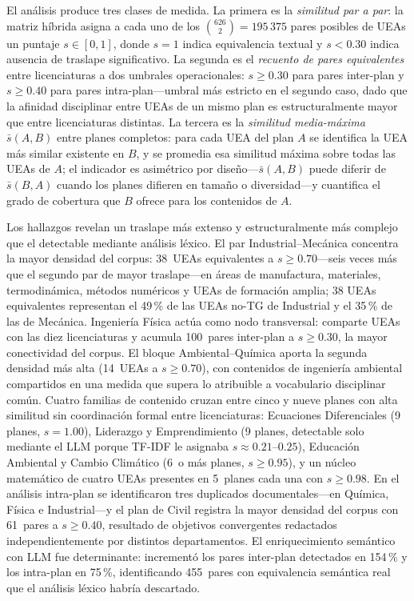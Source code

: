\documentclass[11pt,a4paper]{article}
\begin{document}
El análisis produce tres clases de medida.
La primera es la \textit{similitud par a par}: la matriz híbrida asigna a cada uno de los $\binom{626}{2} = 195\,375$ pares posibles de UEAs un puntaje $s \in [0,1]$, donde $s = 1$ indica equivalencia textual y $s < 0.30$ indica ausencia de traslape significativo.
La segunda es el \textit{recuento de pares equivalentes} entre licenciaturas a dos umbrales operacionales: $s \geq 0.30$ para pares inter-plan y $s \geq 0.40$ para pares intra-plan---umbral más estricto en el segundo caso, dado que la afinidad disciplinar entre UEAs de un mismo plan es estructuralmente mayor que entre licenciaturas distintas.
La tercera es la \textit{similitud media-máxima} $\bar{s}(A,B)$ entre planes completos: para cada UEA del plan $A$ se identifica la UEA más similar existente en $B$, y se promedia esa similitud máxima sobre todas las UEAs de $A$; el indicador es asimétrico por diseño---$\bar{s}(A,B)$ puede diferir de $\bar{s}(B,A)$ cuando los planes difieren en tamaño o diversidad---y cuantifica el grado de cobertura que $B$ ofrece para los contenidos de $A$.

Los hallazgos revelan un traslape más extenso y estructuralmente más complejo que el detectable mediante análisis léxico.
El par Industrial--Mecánica concentra la mayor densidad del corpus: 38~UEAs equivalentes a $s \geq 0.70$---seis veces más que el segundo par de mayor traslape---en áreas de manufactura, materiales, termodinámica, métodos numéricos y UEAs de formación amplia; 38 UEAs equivalentes representan el 49\,\% de las UEAs no-TG de Industrial y el 35\,\% de las de Mecánica.
Ingeniería Física actúa como nodo transversal: comparte UEAs con las diez licenciaturas y acumula 100~pares inter-plan a $s \geq 0.30$, la mayor conectividad del corpus.
El bloque Ambiental--Química aporta la segunda densidad más alta (14~UEAs a $s \geq 0.70$), con contenidos de ingeniería ambiental compartidos en una medida que supera lo atribuible a vocabulario disciplinar común.
Cuatro familias de contenido cruzan entre cinco y nueve planes con alta similitud sin coordinación formal entre licenciaturas: Ecuaciones Diferenciales (9 planes, $s = 1.00$), Liderazgo y Emprendimiento (9 planes, detectable solo mediante el LLM porque TF-IDF le asignaba $s \approx 0.21$--$0.25$), Educación Ambiental y Cambio Climático (6~o más planes, $s \geq 0.95$), y un núcleo matemático de cuatro UEAs presentes en 5~planes cada una con $s \geq 0.98$.
En el análisis intra-plan se identificaron tres duplicados documentales---en Química, Física e Industrial---y el plan de Civil registra la mayor densidad del corpus con 61~pares a $s \geq 0.40$, resultado de objetivos convergentes redactados independientemente por distintos departamentos.
El enriquecimiento semántico con LLM fue determinante: incrementó los pares inter-plan detectados en 154\,\% y los intra-plan en 75\,\%, identificando 455~pares con equivalencia semántica real que el análisis léxico habría descartado.
\end{document}
